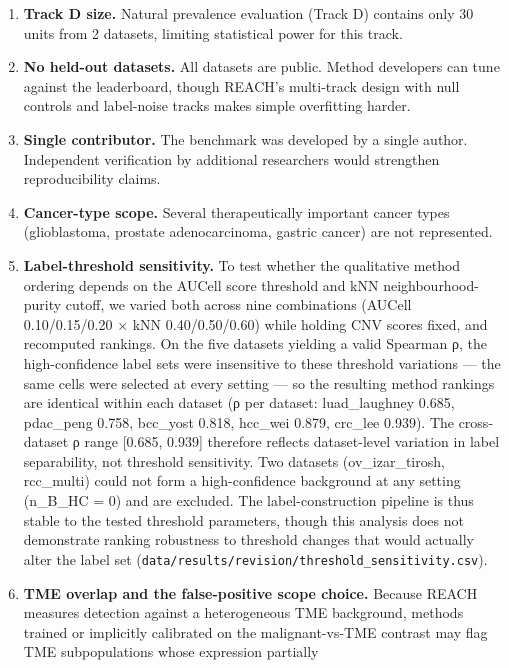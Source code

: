 \documentclass[10pt]{article}
\providecommand{\DIFaddtex}[1]{{\protect\color{trackgreen}#1}} %
\providecommand{\DIFadd}[1]{\texorpdfstring{\DIFaddtex{#1}}{#1}} %
\begin{document}
\begin{enumerate}
{}\item
  \textbf{\DIFadd{Track D size.}} \DIFadd{Natural prevalence evaluation (Track D)
  contains only 30 units from 2 datasets, limiting statistical power for
  this track.
}\item
  \textbf{\DIFadd{No held-out datasets.}} \DIFadd{All datasets are public. Method
  developers can tune against the leaderboard, though REACH's
  multi-track design with null controls and label-noise tracks makes
  simple overfitting harder.
}\item
  \textbf{\DIFadd{Single contributor.}} \DIFadd{The benchmark was developed by a single
  author. Independent verification by additional researchers would
  strengthen reproducibility claims.
}\item
  \textbf{\DIFadd{Cancer-type scope.}} \DIFadd{Several therapeutically important cancer
  types (glioblastoma, prostate adenocarcinoma, gastric cancer) are not
  represented.
}\item
  \textbf{\DIFadd{Label-threshold sensitivity.}} \DIFadd{To test whether the qualitative
  method ordering depends on the AUCell score threshold and kNN
  neighbourhood-purity cutoff, we varied both across nine combinations
  (AUCell 0.10/0.15/0.20 × kNN 0.40/0.50/0.60) while holding CNV scores
  fixed, and recomputed rankings. On the five datasets yielding a valid
  Spearman ρ, the high-confidence label sets were insensitive to these
  threshold variations --- the same cells were selected at every setting
  --- so the resulting method rankings are identical within each dataset
  (ρ per dataset: luad\_laughney 0.685, pdac\_peng 0.758, bcc\_yost
  0.818, hcc\_wei 0.879, crc\_lee 0.939). The cross-dataset ρ range
  }{[}\DIFadd{0.685, 0.939}{]} \DIFadd{therefore reflects dataset-level variation in label
  separability, not threshold sensitivity. Two datasets
  (ov\_izar\_tirosh, rcc\_multi) could not form a high-confidence
  background at any setting (n\_B\_HC = 0) and are excluded. The
  label-construction pipeline is thus stable to the tested threshold
  parameters, though this analysis does not demonstrate ranking
  robustness to threshold changes that would actually alter the label
  set (}\texttt{\DIFadd{data/results/revision/threshold\_sensitivity.csv}}\DIFadd{).
}\item
  \textbf{\DIFadd{TME overlap and the false-positive scope choice.}} \DIFadd{Because
  REACH measures detection against a heterogeneous TME background,
  methods trained or implicitly calibrated on the malignant-vs-TME
  contrast may flag TME subpopulations whose expression partially
}
\end{enumerate}
\end{document}
